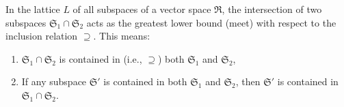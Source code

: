 In the lattice $L$ of all subspaces of a vector space $\mathfrak{R}$, the intersection of two subspaces $\mathfrak{S}_1 \cap \mathfrak{S}_2$ acts as the greatest lower bound (meet) with respect to the inclusion relation $\supseteq$. This means:

\begin{enumerate}
\item $\mathfrak{S}_1 \cap \mathfrak{S}_2$ is contained in (i.e., $\supseteq$) both $\mathfrak{S}_1$ and $\mathfrak{S}_2$,
\item If any subspace $\mathfrak{S}'$ is contained in both $\mathfrak{S}_1$ and $\mathfrak{S}_2$, then $\mathfrak{S}'$ is contained in $\mathfrak{S}_1 \cap \mathfrak{S}_2$.
\end{enumerate}
